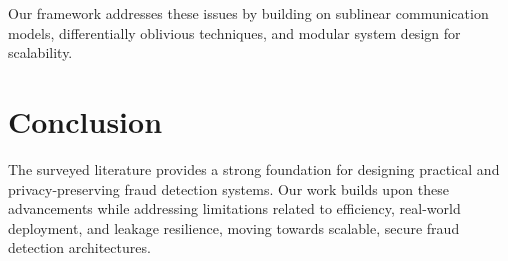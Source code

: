Our framework addresses these issues by building on sublinear communication models, differentially oblivious techniques, and modular system design for scalability.

\section{Conclusion}

The surveyed literature provides a strong foundation for designing practical and privacy-preserving fraud detection systems.  
Our work builds upon these advancements while addressing limitations related to efficiency, real-world deployment, and leakage resilience, moving towards scalable, secure fraud detection architectures.

\clearpage
